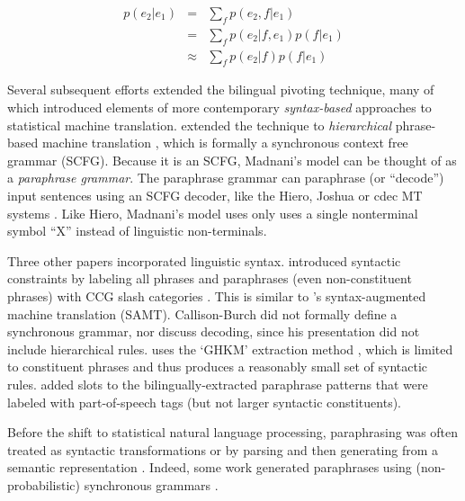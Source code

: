 \documentclass[11pt]{article}
\begin{document}
\begin{eqnarray}
  p(e_2|e_1) &=& \sum_f p(e_2,f|e_1)\\
                  &=& \sum_f p(e_2|f,e_1) p(f|e_1) \\
                  &\approx& \sum_f p(e_2|f) p(f|e_1)
\label{paraphrase_prob_eqn}
\end{eqnarray}

Several subsequent efforts extended the bilingual pivoting technique, many of which introduced 
elements of more contemporary {\it syntax-based} approaches to statistical machine translation.   
 extended the technique to {\it hierarchical}
phrase-based machine translation \cite{Chiang2005}, which is formally a synchronous context free grammar (SCFG).  Because it is an SCFG,  Madnani's model can be thought of as a {\it  paraphrase grammar}. The paraphrase grammar can paraphrase (or ``decode'') input sentences using an SCFG decoder, like the Hiero, Joshua or cdec MT systems \cite{Chiang2007,li-EtAl:2010:WMT,Dyer_etal_2010}.
Like Hiero, Madnani's model uses only uses a single nonterminal symbol ``X'' instead of linguistic non-terminals.


Three other papers incorporated linguistic syntax. 
 introduced syntactic constraints by labeling all phrases and paraphrases (even non-constituent phrases) with CCG slash categories \cite{Steedman1999}. This is similar  to 's syntax-augmented machine translation (SAMT). Callison-Burch did not formally define a synchronous grammar, nor discuss decoding, since his presentation did not include hierarchical rules.
 uses the `GHKM' extraction method \cite{Galley2004}, which is limited to constituent phrases and thus produces a reasonably small set of syntactic rules.
 added slots to the bilingually-extracted 
paraphrase patterns that were labeled with part-of-speech tags (but not
larger syntactic constituents). 

Before the shift to statistical natural language processing, paraphrasing was often treated as syntactic transformations or by parsing and then generating from a semantic representation \cite{mckeown:1979:ACL,Muraki1982,Meteer1988,Shemtov1996,Yamamoto2002}.  Indeed, some work generated paraphrases using (non-probabilistic) synchronous grammars \cite{Shieber1990,Dras1997,Dras1999,Kozlowski2003}.
\end{document}
